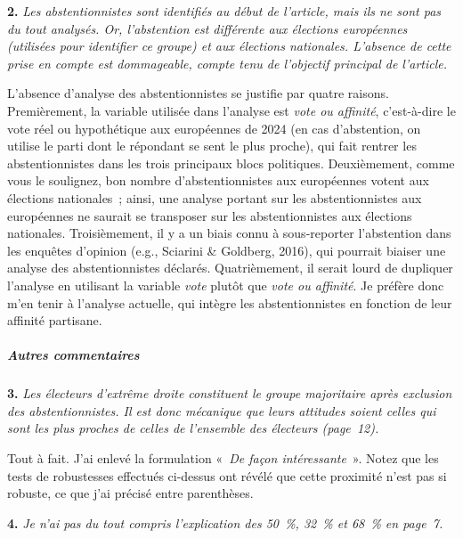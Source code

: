 \documentclass[12pt,french]{article}
\begin{document}
\bigskip
\noindent\textbf{2.} \textit{Les abstentionnistes sont identifiés au début de l'article, mais ils ne sont pas du tout analysés. Or, l'abstention est différente aux élections européennes (utilisées pour identifier ce groupe) et aux élections nationales. L'absence de cette prise en compte est dommageable, compte tenu de l'objectif principal de l'article.}

L'absence d'analyse des abstentionnistes se justifie par quatre raisons. Premièrement, la variable utilisée dans l'analyse est \textit{vote ou affinité}, c'est-à-dire le vote réel ou hypothétique aux européennes de 2024 (en cas d'abstention, on utilise le parti dont le répondant se sent le plus proche), qui fait rentrer les abstentionnistes dans les trois principaux blocs politiques. Deuxièmement, comme vous le soulignez, bon nombre d'abstentionnistes aux européennes votent aux élections nationales~; ainsi, une analyse portant sur les abstentionnistes aux européennes ne saurait se transposer sur les abstentionnistes aux élections nationales. Troisièmement, il y a un biais connu à sous-reporter l'abstention dans les enquêtes d'opinion (e.g., Sciarini \& Goldberg, 2016), qui pourrait biaiser une analyse des abstentionnistes déclarés. Quatrièmement, il serait lourd de dupliquer l'analyse en utilisant la variable \textit{vote} plutôt que \textit{vote ou affinité}. Je préfère donc m'en tenir à l'analyse actuelle, qui intègre les abstentionnistes en fonction de leur affinité partisane.

\subparagraph*{Autres commentaires}

\bigskip
\noindent\textbf{3.} \textit{Les électeurs d'extrême droite constituent le groupe majoritaire après exclusion des abstentionnistes. Il est donc mécanique que leurs attitudes soient celles qui sont les plus proches de celles de l'ensemble des électeurs (page~12).}

Tout à fait. J'ai enlevé la formulation «~\textit{De façon intéressante}~». Notez que les tests de robustesses effectués ci-dessus ont révélé que cette proximité n'est pas si robuste, ce que j'ai précisé entre parenthèses. %

\bigskip
\noindent\textbf{4.} \textit{Je n'ai pas du tout compris l'explication des 50~\%, 32~\% et 68~\% en page~7.}
\end{document}
